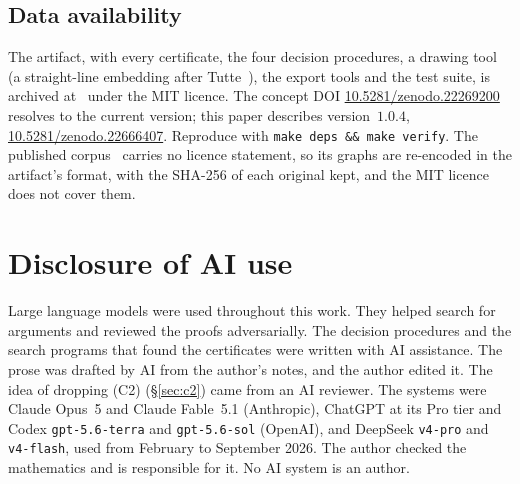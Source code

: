 \documentclass[11pt,a4paper]{amsart}
\theoremstyle{plain}
\theoremstyle{definition}
\begin{document}
\subsection*{Data availability}

The artifact, with every certificate, the four decision procedures, a drawing
tool (a straight-line embedding after Tutte~\cite{Tutte1963}), the export tools
and the test suite, is archived at~\cite{artifact} under the MIT licence. The
concept DOI \href{https://doi.org/10.5281/zenodo.22269200}{10.5281/zenodo.22269200}
resolves to the current version; this paper describes version~$1.0.4$,
\href{https://doi.org/10.5281/zenodo.22666407}{10.5281/zenodo.22666407}.
Reproduce with \texttt{make deps \&\& make verify}. The published
corpus~\cite{APGcorpus} carries no licence statement, so its graphs are
re-encoded in the artifact's format, with the SHA-256 of each original kept, and
the MIT licence does not cover them.

\section*{Disclosure of AI use}

Large language models were used throughout this work. They helped search for
arguments and reviewed the proofs adversarially. The decision procedures and
the search programs that found the certificates were written with AI
assistance. The prose was drafted by AI from the author's notes, and the author
edited it. The idea of dropping (C2) (\S\ref{sec:c2}) came from an AI
reviewer. The systems were Claude Opus~5 and Claude Fable~5.1 (Anthropic),
ChatGPT at its Pro tier and Codex \texttt{gpt-5.6-terra} and
\texttt{gpt-5.6-sol} (OpenAI), and DeepSeek \texttt{v4-pro} and
\texttt{v4-flash}, used from February to September 2026. The author checked the
mathematics and is responsible for it. No AI system is an author.
\end{document}
